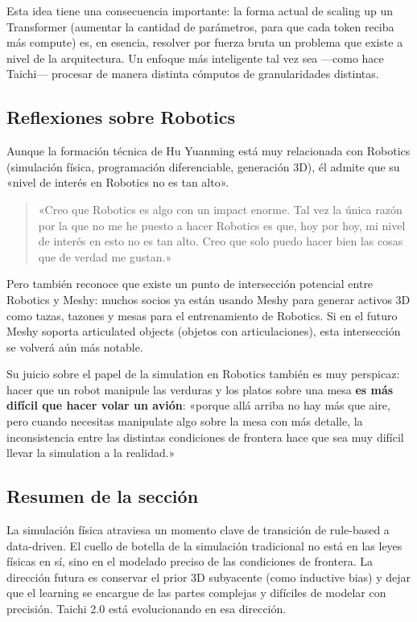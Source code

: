 \documentclass[a4paper]{article}
\begin{document}
Esta idea tiene una consecuencia importante: la forma actual de scaling up un Transformer (aumentar la cantidad de parámetros, para que cada token reciba más compute) es, en esencia, resolver por fuerza bruta un problema que existe a nivel de la arquitectura. Un enfoque más inteligente tal vez sea —como hace Taichi— procesar de manera distinta cómputos de granularidades distintas.

\subsection{Reflexiones sobre Robotics}

Aunque la formación técnica de Hu Yuanming está muy relacionada con Robotics (simulación física, programación diferenciable, generación 3D), él admite que su «nivel de interés en Robotics no es tan alto».

\begin{quote}
«Creo que Robotics es algo con un impact enorme. Tal vez la única razón por la que no me he puesto a hacer Robotics es que, hoy por hoy, mi nivel de interés en esto no es tan alto. Creo que solo puedo hacer bien las cosas que de verdad me gustan.»
\end{quote}

Pero también reconoce que existe un punto de intersección potencial entre Robotics y Meshy: muchos socios ya están usando Meshy para generar activos 3D como tazas, tazones y mesas para el entrenamiento de Robotics. Si en el futuro Meshy soporta articulated objects (objetos con articulaciones), esta intersección se volverá aún más notable.

Su juicio sobre el papel de la simulation en Robotics también es muy perspicaz: hacer que un robot manipule las verduras y los platos sobre una mesa \textbf{es más difícil que hacer volar un avión}: «porque allá arriba no hay más que aire, pero cuando necesitas manipulate algo sobre la mesa con más detalle, la inconsistencia entre las distintas condiciones de frontera hace que sea muy difícil llevar la simulation a la realidad.»

\subsection{Resumen de la sección}

La simulación física atraviesa un momento clave de transición de rule-based a data-driven. El cuello de botella de la simulación tradicional no está en las leyes físicas en sí, sino en el modelado preciso de las condiciones de frontera. La dirección futura es conservar el prior 3D subyacente (como inductive bias) y dejar que el learning se encargue de las partes complejas y difíciles de modelar con precisión. Taichi 2.0 está evolucionando en esa dirección.
\end{document}
